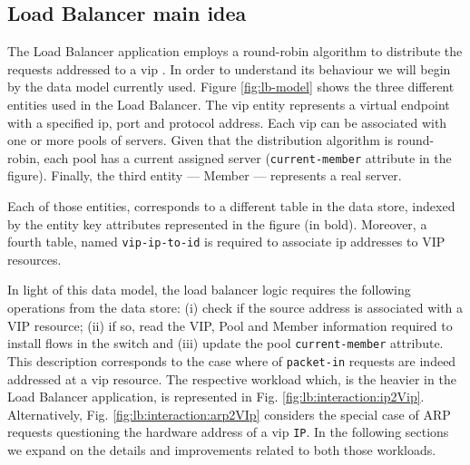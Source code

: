 \subsection{Load Balancer main idea} 
The Load Balancer application employs a round-robin algorithm to distribute the
requests addressed to a \gls{vip} . 
In order to understand its behaviour we will begin by the data model currently used. Figure
\ref{fig:lb-model} shows the three different entities used in the Load
Balancer. The \gls{vip} entity represents a virtual endpoint with a specified \gls{ip}, port and
protocol address. Each \gls{vip} can be associated with one or more pools of 
servers. Given that the distribution algorithm is round-robin, each pool
has a current assigned server (\texttt{current-member} attribute in the figure). Finally, the third entity --- Member
--- represents a real server. 
\item Each of those entities, corresponds
to a different  table  in the data store, indexed by the entity
key attributes represented in the figure (in bold). Moreover, a fourth
table, named \texttt{vip-ip-to-id} is required to associate \gls{ip} addresses to \gls{VIP} resources. 



\begin{figure}[ht]
\TopFloatBoxes
\begin{floatrow}


\end{floatrow}
\end{figure}

In light of this data model, the load balancer logic requires the following
operations from the data store: (i) check if the source address is
associated with a VIP resource; (ii) if so, read the VIP, Pool and
Member information required to install flows in the switch and (iii)
update the pool \texttt{current-member} attribute. This description
corresponds to the case where \gls{of} \texttt{packet-in} requests are indeed addressed at a \gls{vip}
resource. The respective workload which, is the heavier in
the Load Balancer application, is represented in Fig. \ref{fig:lb:interaction:ip2Vip}. Alternatively, Fig. 
\ref{fig:lb:interaction:arp2VIp}  considers the special case of ARP requests questioning the hardware
address of a \gls{vip} \texttt{IP}. In the following sections we
expand on the details and improvements related to both those
workloads. 

